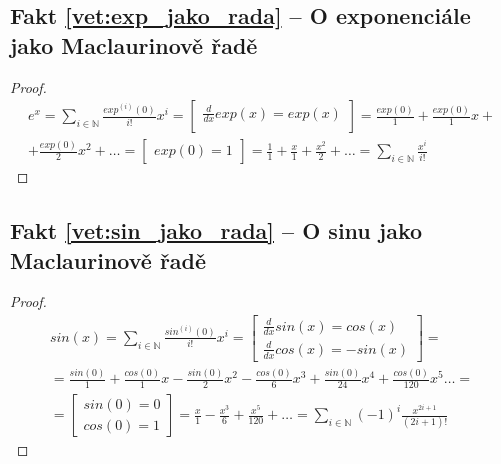 \subsection{Fakt \ref{vet:exp_jako_rada} -- O exponenciále jako Maclaurinově řadě}\label{duk:exp_jako_rada}
\begin{proof}
\begin{equation}
\begin{split}
e^x = \sum_{i\in\mathbb{N}}\frac{exp^{(i)}(0)}{i!}x^i = \left[\begin{matrix}\frac{d}{dx} exp(x) = exp(x) \\ \end{matrix}\right] = \frac{exp(0)}{1} + \frac{exp(0)}{1}x +\\ +\frac{exp(0)}{2}x^2 + \ldots= \left[\begin{matrix} exp(0)=1 \end{matrix}\right] = \frac{1}{1} + \frac{x}{1} + \frac{x^2}{2} + \ldots=\sum_{i\in\mathbb{N}}\frac{x^i}{i!}
\end{split}
\end{equation}
\end{proof}

\subsection{Fakt \ref{vet:sin_jako_rada} -- O sinu jako Maclaurinově řadě}\label{duk:sin_jako_rada}
\begin{proof}
\begin{equation}
\begin{split}
sin(x)=\sum_{i\in\mathbb{N}}\frac{sin^{(i)}(0)}{i!}x^i=\left[\begin{matrix}\frac{d}{dx} sin(x)=cos(x) \\ \frac{d}{dx} cos(x)=-sin(x) \end{matrix} \right] =\\= \frac{sin(0)}{1} + \frac{cos(0)}{1}x-\frac{sin(0)}{2}x^2-\frac{cos(0)}{6}x^3+\frac{sin(0)}{24}x^4+\frac{cos(0)}{120}x^5\ldots=\\=\left[\begin{matrix} sin(0)=0\\ cos(0)=1 \end{matrix}\right]=\frac{x}{1}-\frac{x^3}{6}+\frac{x^5}{120}+\ldots=\sum_{i\in\mathbb{N}}(-1)^i\frac{x^{2i+1}}{(2i+1)!}
\end{split}
\end{equation}
\end{proof}

